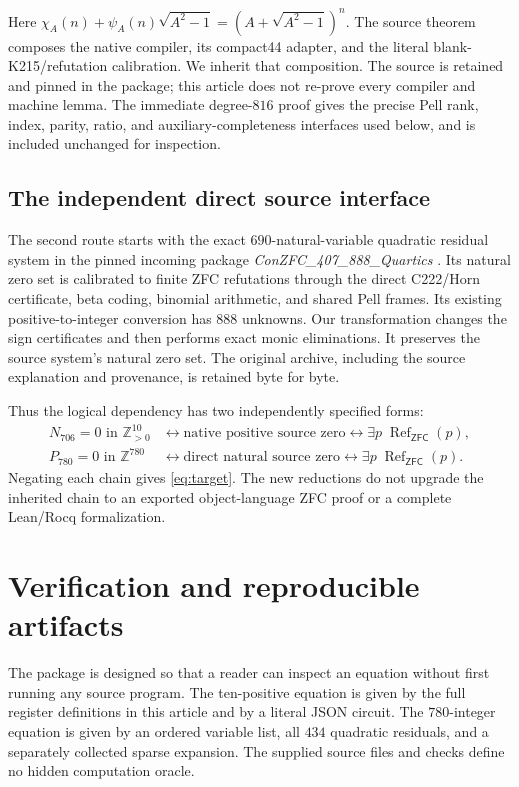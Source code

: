 \documentclass[11pt,letterpaper]{article}
\newcommand{\Z}{\mathbb Z}
\newcommand{\Pos}{\mathbb Z_{>0}}
\newcommand{\Refut}{\operatorname{Ref}}
\newcommand{\ZFC}{\mathsf{ZFC}}
\theoremstyle{definition}
\theoremstyle{remark}
\numberwithin{equation}{section}
\begin{document}
Here $\chi_A(n)+\psi_A(n)\sqrt{A^2-1}
=(A+\sqrt{A^2-1})^n$. The source theorem composes the native compiler,
its compact44 adapter, and the literal blank-K215/refutation calibration.
We inherit that composition. The source is retained and pinned in the
package; this article does not re-prove every compiler and machine lemma.
The immediate degree-$816$ proof \cite{parent816} gives the precise Pell
rank, index, parity, ratio, and auxiliary-completeness interfaces used
below, and is included unchanged for inspection.

\subsection{The independent direct source interface}

The second route starts with the exact $690$-natural-variable quadratic
residual system in the pinned incoming package
\emph{ConZFC\_407\_888\_Quartics} \cite{direct407}. Its natural zero set
is calibrated to finite ZFC refutations through the direct C222/Horn
certificate, beta coding, binomial arithmetic, and shared Pell frames.
Its existing positive-to-integer conversion has $888$ unknowns.
Our transformation changes the sign certificates and then performs exact
monic eliminations. It preserves the source system's natural zero set.
The original archive, including the source explanation and provenance,
is retained byte for byte.

Thus the logical dependency has two independently specified forms:
\[
\begin{split}
 N_{706}=0\text{ in }\Pos^{10}
 &\longleftrightarrow\text{native positive source zero}
 \longleftrightarrow\exists p\;\Refut_{\ZFC}(p),\\
 P_{780}=0\text{ in }\Z^{780}
 &\longleftrightarrow\text{direct natural source zero}
 \longleftrightarrow\exists p\;\Refut_{\ZFC}(p).
\end{split}
\]
Negating each chain gives \eqref{eq:target}.
The new reductions do not upgrade the inherited chain to an exported
object-language ZFC proof or a complete Lean/Rocq formalization.




\section{Verification and reproducible artifacts}
\label{sec:verification}

The package is designed so that a reader can inspect an equation without
first running any source program. The ten-positive equation is given by
the full register definitions in this article and by a literal JSON
circuit. The $780$-integer equation is given by an ordered variable list,
all $434$ quadratic residuals, and a separately collected sparse expansion.
The supplied source files and checks define no hidden computation oracle.
\end{document}
